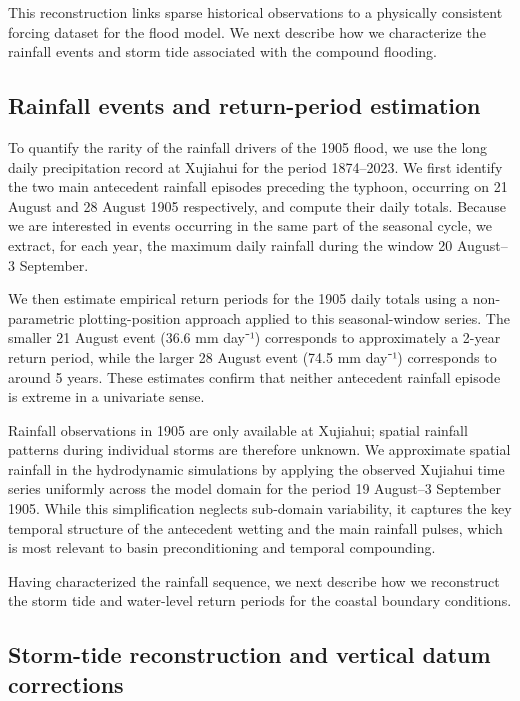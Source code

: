 \documentclass[
]{article}
\begin{document}
This reconstruction links sparse historical observations to a physically
consistent forcing dataset for the flood model. We next describe how we
characterize the rainfall events and storm tide associated with the
compound flooding.

\subsection{\texorpdfstring{\textbf{Rainfall events and return-period
estimation}}{Rainfall events and return-period estimation}}\label{rainfall-events-and-return-period-estimation}

To quantify the rarity of the rainfall drivers of the 1905 flood, we use
the long daily precipitation record at Xujiahui for the period
1874--2023. We first identify the two main antecedent rainfall episodes
preceding the typhoon, occurring on 21 August and 28 August 1905
respectively, and compute their daily totals. Because we are interested
in events occurring in the same part of the seasonal cycle, we extract,
for each year, the maximum daily rainfall during the window 20 August--3
September.

We then estimate empirical return periods for the 1905 daily totals
using a non-parametric plotting-position approach applied to this
seasonal-window series. The smaller 21 August event (36.6 mm day⁻¹)
corresponds to approximately a 2-year return period, while the larger 28
August event (74.5 mm day⁻¹) corresponds to around 5 years. These
estimates confirm that neither antecedent rainfall episode is extreme in
a univariate sense.

Rainfall observations in 1905 are only available at Xujiahui; spatial
rainfall patterns during individual storms are therefore unknown. We
approximate spatial rainfall in the hydrodynamic simulations by applying
the observed Xujiahui time series uniformly across the model domain for
the period 19 August--3 September 1905. While this simplification
neglects sub-domain variability, it captures the key temporal structure
of the antecedent wetting and the main rainfall pulses, which is most
relevant to basin preconditioning and temporal compounding.

Having characterized the rainfall sequence, we next describe how we
reconstruct the storm tide and water-level return periods for the
coastal boundary conditions.

\subsection{\texorpdfstring{\textbf{Storm-tide reconstruction and
vertical datum
corrections}}{Storm-tide reconstruction and vertical datum corrections}}\label{storm-tide-reconstruction-and-vertical-datum-corrections}
\end{document}
